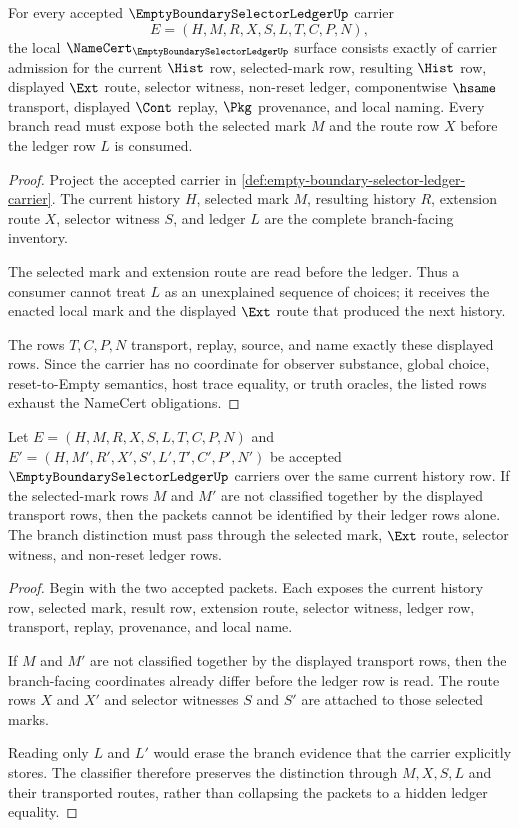 \begin{theorem}\label{thm:empty-boundary-selector-ledger-namecert-obligations}
For every accepted $\EmptyBoundarySelectorLedgerUp$ carrier
$$
E=(H,M,R,X,S,L,T,C,P,N),
$$
the local $\NameCert_{\EmptyBoundarySelectorLedgerUp}$ surface consists exactly of carrier admission for the current $\Hist$ row, selected-mark row, resulting $\Hist$ row, displayed $\Ext$ route, selector witness, non-reset ledger, componentwise $\hsame$ transport, displayed $\Cont$ replay, $\Pkg$ provenance, and local naming. Every branch read must expose both the selected mark $M$ and the route row $X$ before the ledger row $L$ is consumed.
\end{theorem}
\begin{proof}
Project the accepted carrier in \autoref{def:empty-boundary-selector-ledger-carrier}. The current history $H$, selected mark $M$, resulting history $R$, extension route $X$, selector witness $S$, and ledger $L$ are the complete branch-facing inventory.

The selected mark and extension route are read before the ledger. Thus a consumer cannot treat $L$ as an unexplained sequence of choices; it receives the enacted local mark and the displayed $\Ext$ route that produced the next history.

The rows $T,C,P,N$ transport, replay, source, and name exactly these displayed rows. Since the carrier has no coordinate for observer substance, global choice, reset-to-Empty semantics, host trace equality, or truth oracles, the listed rows exhaust the NameCert obligations.
\end{proof}

\begin{theorem}\label{thm:empty-boundary-selector-ledger-branch-separation}
Let $E=(H,M,R,X,S,L,T,C,P,N)$ and $E'=(H,M',R',X',S',L',T',C',P',N')$ be accepted $\EmptyBoundarySelectorLedgerUp$ carriers over the same current history row. If the selected-mark rows $M$ and $M'$ are not classified together by the displayed transport rows, then the packets cannot be identified by their ledger rows alone. The branch distinction must pass through the selected mark, $\Ext$ route, selector witness, and non-reset ledger rows.
\end{theorem}
\begin{proof}
Begin with the two accepted packets. Each exposes the current history row, selected mark, result row, extension route, selector witness, ledger row, transport, replay, provenance, and local name.

If $M$ and $M'$ are not classified together by the displayed transport rows, then the branch-facing coordinates already differ before the ledger row is read. The route rows $X$ and $X'$ and selector witnesses $S$ and $S'$ are attached to those selected marks.

Reading only $L$ and $L'$ would erase the branch evidence that the carrier explicitly stores. The classifier therefore preserves the distinction through $M,X,S,L$ and their transported routes, rather than collapsing the packets to a hidden ledger equality.
\end{proof}

